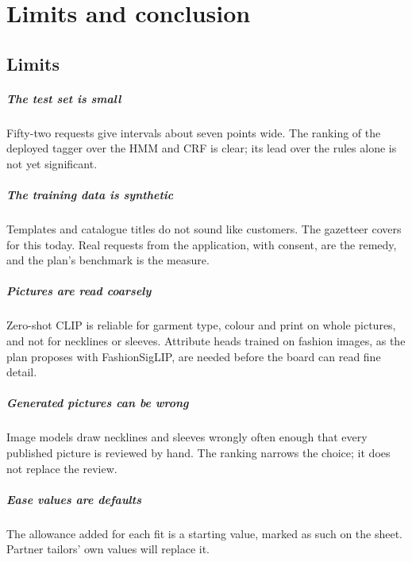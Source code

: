 \chapter{Limits and conclusion}\label{ch:end}

\section{Limits}
\paragraph{The test set is small} Fifty-two requests give intervals about seven points wide. The ranking of the deployed tagger over the HMM and CRF is clear; its lead over the rules alone is not yet significant.

\paragraph{The training data is synthetic} Templates and catalogue titles do not sound like customers. The gazetteer covers for this today. Real requests from the application, with consent, are the remedy, and the plan's benchmark is the measure.

\paragraph{Pictures are read coarsely} Zero-shot CLIP is reliable for garment type, colour and print on whole pictures, and not for necklines or sleeves. Attribute heads trained on fashion images, as the plan proposes with FashionSigLIP, are needed before the board can read fine detail.

\paragraph{Generated pictures can be wrong} Image models draw necklines and sleeves wrongly often enough that every published picture is reviewed by hand. The ranking narrows the choice; it does not replace the review.

\paragraph{Ease values are defaults} The allowance added for each fit is a starting value, marked as such on the sheet. Partner tailors' own values will replace it.

